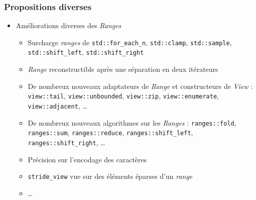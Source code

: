 \documentclass[C++.tex]{subfiles}
\begin{document}
\begin{frame}[fragile]
	\frametitle{Propositions diverses}
	\begin{itemize}
		\item Améliorations diverses des \textit{Ranges}
		\begin{itemize}
			\item Surcharge \textit{ranges} de \lstinline|std::for_each_n|, \lstinline|std::clamp|, \lstinline|std::sample|, \lstinline|std::shift_left|, \lstinline|std::shift_right|
			\item \textit{Range} reconstructible après une séparation en deux itérateurs
			\item De nombreux nouveaux adaptateurs de \textit{Range} et constructeurs de \textit{View} : \lstinline|view::tail|, \lstinline|view::unbounded|, \lstinline|view::zip|, \lstinline|view::enumerate|, \lstinline|view::adjacent|, \ldots
			\item De nombreux nouveaux algorithmes sur les \textit{Ranges} : \lstinline|ranges::fold|, \lstinline|ranges::sum|, \lstinline|ranges::reduce|, \lstinline|ranges::shift_left|, \lstinline|ranges::shift_right|, \ldots
			\item Précision sur l'encodage des caractères 
			\item \lstinline|stride_view| vue sur des éléments éparses d'un \textit{range}
			\item \ldots
		\end{itemize}
	\end{itemize}
\end{frame}
\end{document}

